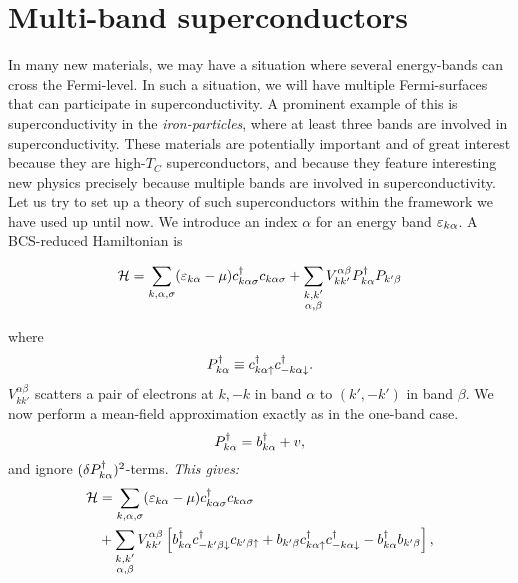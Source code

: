 
\section{Multi-band superconductors}

In many new materials, we may have a situation where several energy-bands can cross the Fermi-level. In such a situation, we will have multiple Fermi-surfaces that can participate in superconductivity. A prominent example of this is superconductivity in the \emph{iron-particles}, where at least three bands are involved in superconductivity. These materials are potentially important and of great interest because they  are high-$T_C$ superconductors, and because they feature interesting new physics precisely because multiple bands are involved in superconductivity. Let us try to set up a theory of such superconductors within the framework we have used up until now. We introduce an index $\alpha$ for an energy band $\varepsilon_{k\alpha}$.
A BCS-reduced Hamiltonian is
\begin{tcolorbox}
	\begin{equation}		
		\mathcal{H} =
		 \sum_{k,\alpha, \sigma}(\varepsilon_{k\alpha}-\mu)c^{\dagger}_{k\alpha\sigma}c_{k\alpha\sigma}
		+ \sum_{\substack{k,k' \\ \alpha,\beta}}V_{kk'}^{\alpha\beta}P_{k\alpha}^{\dagger}P_{k'\beta}
	\end{equation}
\end{tcolorbox}
where 
\begin{equation}
	P_{k\alpha}^{\dagger} \equiv c^{\dagger}_{k\alpha\uparrow}c^{\dagger}_{-k\alpha\downarrow}.
\end{equation}
$V_{kk'}^{\alpha\beta}$ scatters a pair of electrons at $k,-k$ in band $\alpha$ to $(k', -k')$ in band $\beta$.
We now perform a mean-field approximation exactly as in the one-band case.
\begin{equation}
	P_{k\alpha}^{\dagger} = b_{k\alpha}^{\dagger} + v,
\end{equation}
and ignore $(\delta P_{k\alpha}^{\dagger})^2$-terms.
\emph{This gives:}
\begin{equation}
\begin{aligned}
	\mathcal{H} &= \sum_{k,\alpha, \sigma}(\varepsilon_{k\alpha}-\mu)c^{\dagger}_{k\alpha\sigma}c_{k\alpha\sigma} \\
	& + \sum_{\substack{k,k' \\ \alpha,\beta}}V_{kk'}^{\alpha\beta}\left [ b_{k\alpha}^{\dagger}c^{\dagger}_{-k'\beta\downarrow}c_{k'\beta\uparrow}  +  b_{k'\beta}c^{\dagger}_{k\alpha\uparrow}c^{\dagger}_{-k\alpha\downarrow} - b_{k\alpha}^{\dagger}b_{k'\beta}\right ],
\end{aligned}
\end{equation}
